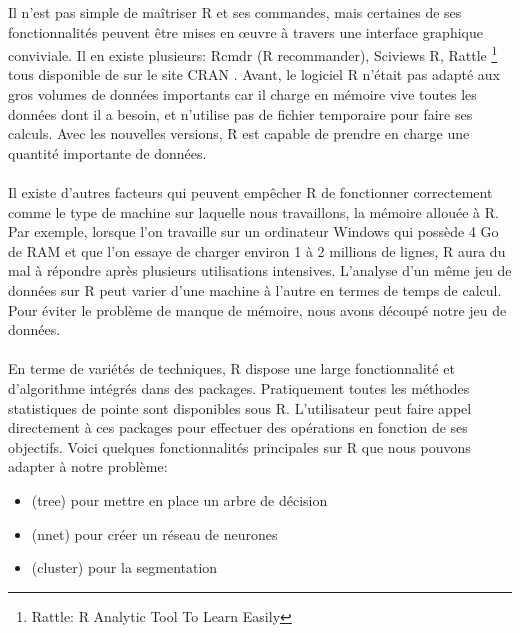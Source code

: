 \documentclass[11pt,a4paper]{report}
\begin{document}
   Il n'est pas simple de maîtriser R et ses commandes, mais certaines de ses fonctionnalités peuvent être mises en œuvre à travers une interface graphique conviviale. Il en existe plusieurs: 
Rcmdr (R recommander), Sciviews R, Rattle \footnote{Rattle:  R Analytic Tool To Learn Easily}  tous disponible de sur le site CRAN \cite{r}.
Avant, le logiciel R n'était pas adapté aux gros volumes de données importants car il charge en mémoire vive toutes les données dont il a besoin, et n'utilise pas de fichier temporaire pour faire ses calculs. Avec les nouvelles versions, R est capable de prendre en charge une quantité importante de données. \\\\
Il existe d'autres facteurs qui peuvent empêcher R de fonctionner correctement comme le type de machine sur laquelle nous travaillons, la mémoire allouée à R. Par exemple, lorsque l'on travaille sur un ordinateur Windows qui possède 4 Go de RAM  et que l'on essaye de charger environ 1 à 2 millions de lignes, R aura du mal à répondre après plusieurs utilisations intensives. L'analyse d'un même jeu de données sur R peut varier d'une machine à l'autre en termes de temps de calcul. \\ Pour éviter le problème de manque de mémoire, nous avons découpé notre jeu de données. \\\\
En terme de variétés de techniques, R dispose une large fonctionnalité et d'algorithme intégrés dans des packages. Pratiquement toutes les méthodes statistiques de pointe sont disponibles sous R. L'utilisateur peut faire appel directement à ces packages pour effectuer des opérations en fonction de ses objectifs. 
Voici quelques fonctionnalités principales  sur R que nous pouvons adapter à notre problème: 

\begin{itemize}
\item (tree) pour mettre en place un arbre de décision
\item (nnet) pour créer un réseau de neurones 
\item (cluster) pour la segmentation 
\end{itemize}
\end{document}
